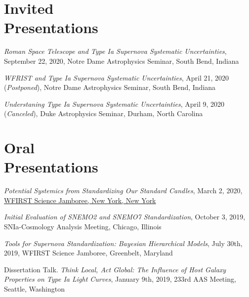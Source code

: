 \documentclass[margin]{res}
\begin{document}
\begin{resume}
\section{Invited \\Presentations}

\hangindent=15pt 
{\it Roman Space Telescope and Type Ia Supernova Systematic Uncertainties}, September 22, 2020, Notre Dame Astrophysics Seminar, South Bend, Indiana
\vspace{-12pt}

\hangindent=15pt 
{\it WFRIST and Type Ia Supernova Systematic Uncertainties}, April 21, 2020 (\textit{Postponed}), Notre Dame Astrophysics Seminar, South Bend, Indiana
\vspace{-12pt}

\hangindent=15pt 
{\it Understaning Type Ia Supernova Systematic Uncertainties}, April 9, 2020 (\textit{Canceled}), Duke Astrophysics Seminar, Durham, North Carolina


\section{Oral \\Presentations}

\hangindent=15pt 
{\sl Potential Systemics from Standardizing Our Standard Candles}, March 2, 2020, \href{https://indico.flatironinstitute.org/event/122/#43-potential-systemics-from-st}{WFIRST Science Jamboree, New York, New York}
\vspace{-12pt}


\hangindent=15pt 
{\sl Initial Evaluation of SNEMO2 and SNEMO7 Standardization}, October 3, 2019, SNIa-Cosmology Analysis Meeting, Chicago, Illinois
\vspace{-12pt}

\hangindent=15pt 
{\sl Tools for Supernova Standardization: 
Bayesian Hierarchical Models}, July 30th, 2019,
WFIRST Science Jamboree, Greenbelt, Maryland
\vspace{-12pt}




\hangindent=15pt 
Dissertation Talk. {\sl Think Local, Act Global: The Influence of Host Galaxy Properties on Type Ia Light Curves}, January 9th, 2019,
233rd AAS Meeting, Seattle, Washington
\vspace{-12pt}


\end{resume}
\end{document}
